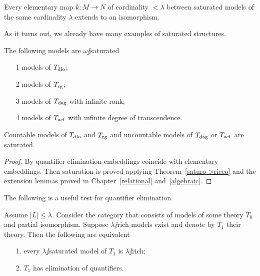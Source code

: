 \documentclass[creche.tex]{subfiles}
\begin{document}
\begin{corollary}
Every elementary map $k:M\to N$ of cardinality $<\lambda$ between saturated models of the same cardinality $\lambda$ extends to an isomorphism.\QED
\end{corollary}

As it turns out, we already have many examples of saturated structures.

\begin{corollary}
The following models are $\omega\jj$saturated
\begin{itemize}
\item[1] models of $T_{\rm dlo}$;
\item[2] models of $T_{\rm rg}$;
\item[3] models of $T_{\rm dag}$ with infinite rank;
\item[4] models of $T_{\rm acf}$ with infinite degree of transcendence.
\end{itemize}
Countable models of $T_{\rm dlo}$ and $T_{\rm rg}$ and uncountable models of $T_{\rm dag}$ or $T_{\rm acf}$ are saturated. 
\end{corollary}
\begin{proof}
By quantifier elimination embeddings coincide with elementary embeddings. Then saturation is proved applying Theorem~\ref{saturo->ricco} and the extension lemmas proved in Chapter~\ref{relational} and~\ref{algebraic}.
\end{proof}

The following is a useful test for quantifier elimination.

\begin{theorem}\label{thm_ricchezza_saturazione_QE}
Assume $|L|\le\lambda$. Consider the category that consists of models of some theory $T_0$ and partial isomorphism. Suppose $\lambda\jj$rich models exist and denote by $T_1$ their theory. Then the following are equivalent
\begin{itemize}
\item[1.] every $\lambda\jj$saturated model of $T_1$ is $\lambda\jj$rich;
\item[2.] $T_1$ has elimination of quantifiers.
\end{itemize}
\end{theorem}
\end{document}
